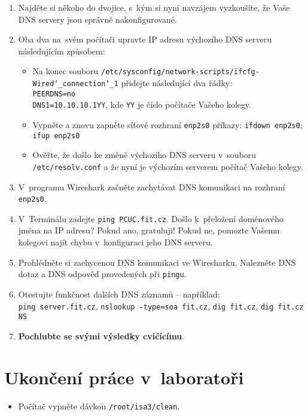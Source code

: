 \begin{enumerate}
  \item Najděte si někoho do dvojice, s~kým si nyní navzájem vyzkoušíte, že Vaše DNS servery jsou správně nakonfigurované.
  \item Oba dva na~svém počítači upravte IP adresu výchozího DNS serveru následujícím způsobem:
  \begin{itemize}
    \item Na konec souboru {\tt /etc/sysconfig/network-scripts/ifcfg-Wired\char`_connection\char`_1} přidejte následující dva řádky:\\
          \verb|PEERDNS=no|\\
          \verb|DNS1=10.10.10.1YY|, kde {\tt YY} je číslo počítače Vašeho kolegy.
    \item Vypněte a znovu zapněte síťové rozhraní {\tt enp2s0} příkazy: {\tt ifdown enp2s0}; {\tt ifup enp2s0}
    \item Ověřte, že došlo ke změně výchozího DNS serveru v~souboru {\tt /etc/resolv.conf} a že nyní je výchozím serverem počítač Vašeho kolegy.
  \end{itemize}
  \item V~programu Wireshark začněte zachytávat DNS komunikaci na rozhraní {\tt enp2s0}.
  \item V~Terminálu zadejte {\tt ping PCUC.fit.cz}. Došlo k~přeložení doménového jména na IP adresu? Pokud ano, gratuluji! Pokud ne, pomozte Vašemu kolegovi najít chybu
    v~konfiguraci jeho DNS serveru.
  \item Prohlédněte si zachycenou DNS komunikaci ve Wiresharku. Nalezněte DNS dotaz a DNS odpověď provedených při {\tt pingu}.
  \item Otestujte funkčnost dalších DNS záznamů -- například:\\
        {\tt ping server.fit.cz}, {\tt nslookup -type=soa fit.cz}, {\tt dig fit.cz}, {\tt dig fit.cz NS}
  \item {\bf Pochlubte se svými výsledky cvičícímu}.
\end{enumerate}




\section{Ukončení práce v~laboratoři}
\begin{itemize}
  \item Počítač vypněte dávkou {\tt /root/isa3/clean}.
\end{itemize}

